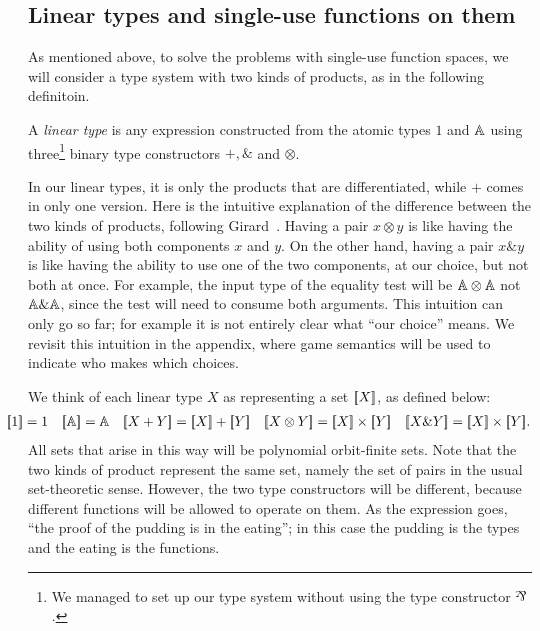 \subsection{Linear types and single-use functions on them}
\label{sec:linear-types-and-single-use-functions}
As mentioned above, to solve the problems with single-use function spaces, we will consider a type system with two kinds of products, as in the following definitoin.
\begin{definition}\label{def:datatypes}
    A \emph{linear type} is any expression constructed from the atomic types $1$ and $\mathbb A$ using three\footnote{We managed to set up our type system without using the type constructor  $\rotatebox[origin=c]{180}{\&}$.} binary type constructors $+, \&$ and $\otimes$. 
\end{definition}
In our linear types, it is only the products that are differentiated, while  $+$ comes in only one version. 
    Here is the intuitive explanation of the difference between the two kinds of products, following Girard~\cite[p.2]{girard1995advances}. Having a pair $x \otimes y$ is like having the ability of using both components $x$ and $y$. On the other hand, having a pair $x \& y$ is like having the ability to use one of the two components, at our choice, but not both at once. For example, the input type of the equality test will be $\mathbb A \otimes \mathbb A$ not $\mathbb A \& \mathbb A$, since the test will need to consume both arguments. This intuition can only go so far; for example it is not entirely clear what ``our choice'' means. We revisit this intuition in  the appendix, where game semantics will be used to indicate who makes which choices. 



We think of each linear type $X$ as representing a set $[{\kern-0.45ex}[X]{\kern-0.45ex}]$, as defined below:
\begin{align*}
\hspace{-0.6cm}
    \sem{1} = 1
\quad 
\sem{\atoms} = \atoms 
\quad 
\sem{X+Y} = \sem X + \sem Y 
\quad 
\sem{X \otimes Y} = \sem X \times \sem Y 
\quad
\sem{X \& Y} = \sem X \times \sem Y.
\end{align*}
All sets that arise in this way will be polynomial orbit-finite sets.
Note that the two kinds of product represent the same set, namely the set of pairs in the usual set-theoretic sense. 
However, the two type constructors will be  different, because different functions will be allowed to operate on them. As the expression goes, ``the proof of the pudding is in the eating''; in this case the pudding is the types and the eating is the functions.  

